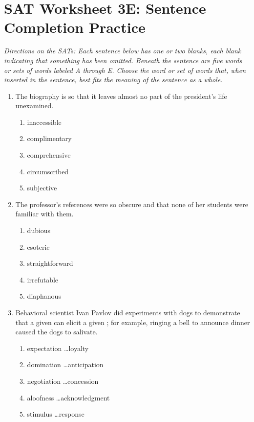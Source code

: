 \documentclass[12pt]{book}
\newcommand{\longline}{\underline{\hspace{2in}} }
\begin{document}
\vfill
\newpage

\section[Practice]{SAT Worksheet 3E: Sentence Completion Practice}
\textit{Directions on the SATs: Each sentence below has one or two blanks, each blank indicating that something has been omitted.  Beneath the sentence are five words or sets of words labeled A through E.  Choose the word or set of words that, when inserted in the sentence, best fits the meaning of the sentence as a whole.}

\begin{enumerate}
\item The biography is so \longline that it leaves almost no part of the president's life unexamined.
\begin{enumerate}[label=(\Alph*)]
\item inaccessible
\item complimentary
\item comprehensive
\item circumscribed
\item subjective
\end{enumerate}

\bigskip
\item The professor's references were so obscure and \longline that none of her students were familiar with them.
\begin{enumerate}[label=(\Alph*)]
\item dubious
\item esoteric
\item straightforward
\item irrefutable
\item diaphanous
\end{enumerate}

\bigskip
\item Behavioral scientist Ivan Pavlov did experiments with dogs to demonstrate that a given \longline can elicit a given \longline; for example, ringing a bell to announce dinner caused the dogs to salivate.
\begin{enumerate}[label=(\Alph*)]
\item expectation \ldots loyalty
\item domination \ldots anticipation
\item negotiation \ldots concession
\item aloofness \ldots acknowledgment
\item stimulus \ldots response 
\end{enumerate}


\end{enumerate}
\end{document}
